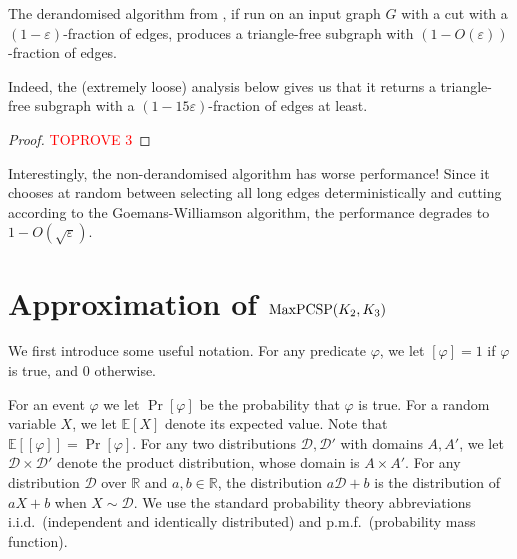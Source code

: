\documentclass[a4paper,11pt, DIV=11]{scrartcl}
\renewcommand{\epsilon}{\varepsilon}
\renewcommand{\phi}{\varphi}
\DeclareMathOperator{\maxPCSP}{\textup{MaxPCSP}}
\renewcommand{\R}{\ensuremath{\mathbb{R}}}
\theoremstyle{plain}
\theoremstyle{definition}
\begin{document}
\begin{theorem}\label{thm:almost}
    The derandomised algorithm from , if run on an input graph $G$ with a cut with a  $(1 - \epsilon)$-fraction of edges, produces a triangle-free subgraph with $(1 - O(\epsilon))$-fraction of edges.
\end{theorem}
Indeed, the (extremely loose) analysis below gives us that it returns a triangle-free subgraph with a $(1 - 15\epsilon)$-fraction of edges at least.
\begin{proof}\textcolor{red}{TOPROVE 3}\end{proof}

Interestingly, the non-derandomised algorithm has worse performance! Since it chooses at random between selecting all long edges deterministically and cutting according to the Goemans-Williamson algorithm, the performance degrades to $1 - O(\sqrt{\epsilon})$.

    

\section{\texorpdfstring{Approximation of $\maxPCSP(K_2,K_3)$}{Approximation of maxPCSP(K2,K3)}}
\label{sec:23}

We first introduce some useful notation.
For any predicate $\phi$, we let $[\phi] = 1$ if $\phi$ is true, and $0$ otherwise.

For an event $\phi$ we let $\Pr [\phi]$ be the probability that $\phi$ is true. For a random variable $X$, we let $\mathbb{E}[X]$ denote its expected value. Note that $\mathbb{E}[ [\phi]] = \Pr[\phi]$.
For any two distributions $\mathcal{D}, \mathcal{D}'$ with domains $A, A'$, we let $\mathcal{D} \times \mathcal{D}'$ denote the product distribution, whose domain is $A \times A'$.
For any distribution $\mathcal{D}$ over $\R$ and $a, b \in \R$, the distribution $a\mathcal{D} + b$ is the distribution of $aX + b$ when $X \sim \mathcal{D}$.
We use the standard probability theory abbreviations i.i.d.~(independent and identically distributed) and p.m.f.~(probability mass function).
\end{document}
